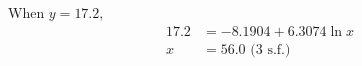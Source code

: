 \documentclass[11pt,a4paper]{book}
\begin{document}
\begin{example}
\begin{enumerate}[label=(\alph*)]
When $y=17.2$,
\begin{align*}
17.2 & =-8.1904+6.3074\ln x\\
x & =56.0\text{ (3 s.f.)}
\end{align*}

\end{enumerate}
\end{example}

\end{document}
